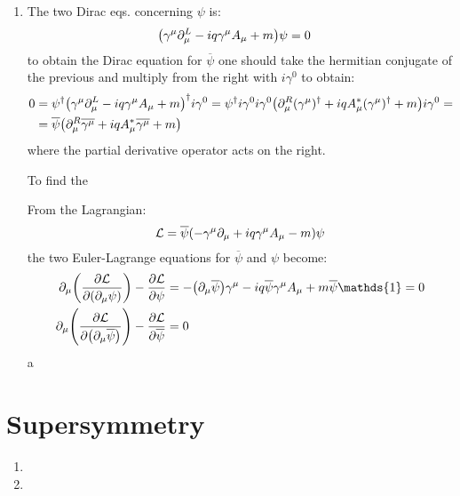 \documentclass[11pt, oneside]{article}   	%
\begin{document}
\begin{enumerate}[label=\alph*)]
\item The two Dirac eqs. concerning $\psi$ is:
\begin{align*}
	\qty(\gamma^\mu \partial_\mu^L - i q \gamma^\mu A_\mu + m)\psi &= 0 
\end{align*}
to obtain the Dirac equation for $\overline{\psi}$ one should take the hermitian conjugate of the previous and multiply from the right with $i\gamma^0$ to obtain:
\begin{align*}
	0&=\psi^\dagger \qty(\gamma^\mu \partial_\mu^L - i q \gamma^\mu A_\mu + m)^\dagger i\gamma^0 = \psi^\dagger i \gamma^0 i\gamma^0 \qty(\partial_\mu^R (\gamma^\mu)^\dagger + i q A_\mu^* (\gamma^\mu)^\dagger  + m) i\gamma^0 = \\
	&= \overline{\psi} \qty( \partial_\mu^R \overline{\gamma^\mu}  + iq A_\mu^* \overline{\gamma^\mu} + m) \\
\end{align*}
where the partial derivative operator acts on the right.

To find the 

From the Lagrangian:
\[
	\mathcal{L} = \overline{\psi} \qty( -\gamma^\mu \partial_\mu + i q\gamma^\mu A_\mu -m ) \psi
\]
the two Euler-Lagrange equations for $\overline{\psi}$ and $\psi$ become:
\begin{align*}
	\partial_\mu \qty(\pdv{\mathcal{L}}{\qty(\partial_\mu \psi)} ) - \pdv{\mathcal{L}}{\psi} &= -\qty(\partial_\mu \overline{\psi} ) \gamma^\mu - iq \overline{\psi} \gamma^\mu A_\mu + m \overline{\psi} \mathds{1} = 0 \\
	\partial_\mu \qty(\pdv{\mathcal{L}}{\qty(\partial_\mu \overline{\psi})} ) - \pdv{\mathcal{L}}{\overline{\psi}} &= 0
\end{align*}
a
\end{enumerate}

\section{Supersymmetry}

\begin{enumerate}[label=\alph*)]

\item

\item


\end{enumerate}
\end{document}
